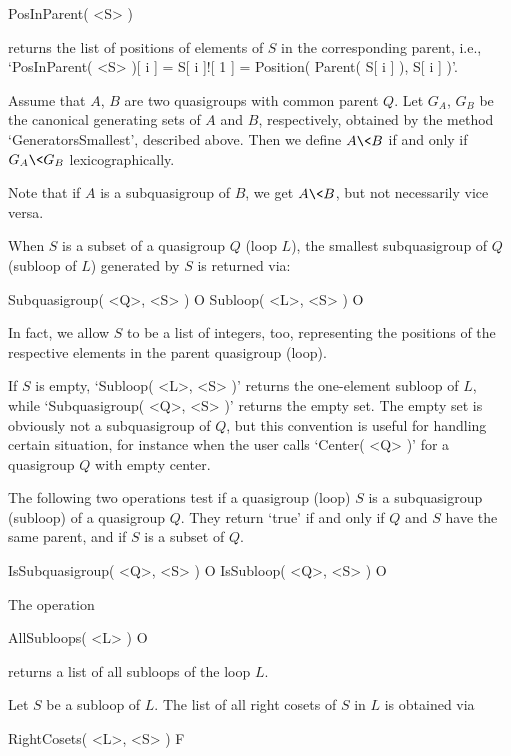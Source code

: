 \>PosInParent( <S> )

returns the list of positions of elements of $S$ in the corresponding parent,
i.e., `PosInParent( <S> )[ i ] = S[ i ]![ 1 ] = Position( Parent( S[ i ] ), S[
i ] )'.


\noindent Assume that $A$, $B$ are two quasigroups with common parent $Q$. Let
$G_A$, $G_B$ be the canonical generating sets of $A$ and $B$, respectively,
obtained by the method `GeneratorsSmallest', described above. Then we
define $A \< B$ if and only if $G_A \< G_B$ lexicographically.

Note that if $A$ is a subquasigroup of $B$, we get $A\<B$, but not necessarily
vice versa.



When $S$ is a subset of a quasigroup $Q$ (loop $L$), the smallest subquasigroup
of $Q$ (subloop of $L$) generated by $S$ is returned via:

\>Subquasigroup( <Q>, <S> ) O
\>Subloop( <L>, <S> ) O

In fact, we allow $S$ to be a list of integers, too, representing the positions
of the respective elements in the parent quasigroup (loop).

If $S$ is empty, `Subloop( <L>, <S> )' returns the one-element subloop of $L$, while `Subquasigroup( <Q>, <S> )' returns the empty set. The empty set is obviously not a subquasigroup of $Q$, but this convention is useful for handling certain situation, for instance when the user calls `Center( <Q> )' for a quasigroup $Q$ with empty center.

The following two operations test if a quasigroup (loop) $S$ is a subquasigroup
(subloop) of a quasigroup $Q$. They return `true' if and only if $Q$ and $S$
have the same parent, and if $S$ is a subset of $Q$.

\>IsSubquasigroup( <Q>, <S> ) O
\>IsSubloop( <Q>, <S> ) O

The operation

\>AllSubloops( <L> ) O

returns a list of all subloops of the loop $L$.

Let $S$ be a subloop of $L$. The list of all right cosets of $S$
in $L$ is obtained via

\>RightCosets( <L>, <S> ) F

